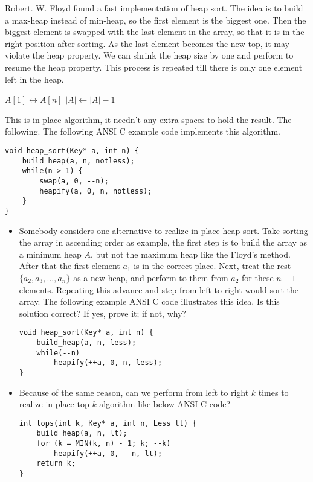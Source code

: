 \documentclass{article}
\begin{document}
Robert. W. Floyd found a fast implementation of heap sort.
The idea is to build a max-heap instead of min-heap, so the first
element is the biggest one. Then the biggest element is swapped
with the last element in the array, so that it is in the right
position after sorting. As the last element becomes the new top,
it may violate the heap property. We can shrink the heap size
by one and perform
 to resume the heap property.
This process
is repeated till there is only one element left in the heap.

\begin{algorithmic}[1]
  \State {}
    \State {} $A[1] \leftrightarrow A[n]$
    \State $|A| \gets |A| - 1$
    \State {}
  \EndWhile
\EndFunction
\end{algorithmic}

This is in-place algorithm, it needn't any extra spaces to hold
the result. The following. The following ANSI C example code
implements this algorithm.

\lstset{language=C}
\begin{lstlisting}
void heap_sort(Key* a, int n) {
    build_heap(a, n, notless);
    while(n > 1) {
        swap(a, 0, --n);
        heapify(a, 0, n, notless);
    }
}
\end{lstlisting}

\begin{Exercise}
\begin{itemize}
\item Somebody considers one alternative to realize in-place heap sort. Take
sorting the array in ascending order as example, the first step is to build
the array as a minimum heap $A$, but not the maximum heap like the Floyd's method.
After that the first element $a_1$ is in the correct place. Next, treat
the rest $\{a_2, a_3, ..., a_n\}$ as a new heap, and perform
 to them from $a_2$ for these $n-1$ elements. Repeating this
advance and  step from left to right would sort the array.
The following example ANSI C code illustrates this idea.
Is this solution correct? If yes, prove it; if not, why?
\lstset{language=C}
\begin{lstlisting}
void heap_sort(Key* a, int n) {
    build_heap(a, n, less);
    while(--n)
        heapify(++a, 0, n, less);
}
\end{lstlisting}

\item Because of the same reason, can we perform  from
left to right $k$ times to realize in-place top-$k$ algorithm like below
ANSI C code?
\lstset{language=C}
\begin{lstlisting}
int tops(int k, Key* a, int n, Less lt) {
    build_heap(a, n, lt);
    for (k = MIN(k, n) - 1; k; --k)
        heapify(++a, 0, --n, lt);
    return k;
}
\end{lstlisting}
\end{itemize}
\end{Exercise}
\end{document}
